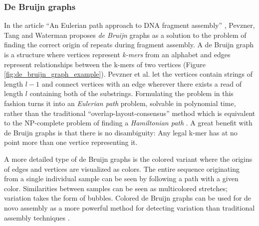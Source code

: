 \documentclass[thesis.tex]{subfiles}
\begin{document}
\subsubsection{De Bruijn graphs}
\label{sec:de_bruijn_graphs}
In the article ``An Eulerian path approach to DNA fragment assembly'' \cite{an_eulerian_path_approach_to_dna_fragment_assembly}, Pevzner, Tang and Waterman proposes \textit{de Bruijn} graphs as a solution to the problem of finding the correct origin of repeats during fragment assembly. A de Bruijn graph is a structure where vertices represent \textit{k-mers} from an alphabet and edges represent relationships between the k-mers of two vertices (Figure \ref{fig:de_bruijn_graph_example}). Pevzner et al. let the vertices contain strings of length $l-1$ and connect vertices with an edge wherever there exists a read of length $l$ containing both of the substrings. Formulating the problem in this fashion turns it into an \textit{Eulerian path} problem, solvable in polynomial time, rather than the traditional ``overlap-layout-consensus'' method which is equivalent to the NP-complete problem of finding a \textit{Hamiltonian path} \cite[Section 11.1]{algorithms_sequential_parallell_and_distributed}. A great benefit with de Bruijn graphs is that there is no disambiguity: Any legal k-mer has at no point more than one vertice representing it.\\
\par\noindent
A more detailed type of de Bruijn graphs is the colored variant where the origins of edges and vertices are visualized as colors. The entire sequence originating from a single individual sample can be seen by following a path with a given color. Similarities between samples can be seen as multicolored stretches; variation takes the form of bubbles. Colored de Bruijn graphs can be used for de novo assembly as a more powerful method for detecting variation than traditional assembly techniques \cite{de_novo_assembly_and_genotyping_of_variants_using_colored_de_bruijn_graphs}.
\end{document}
